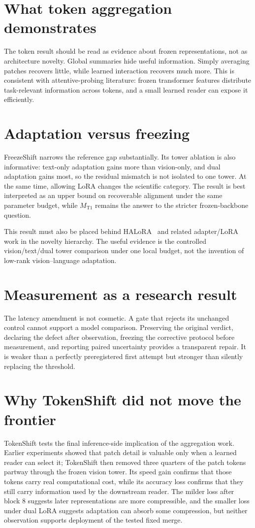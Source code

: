 \documentclass[11pt,a4paper,oneside]{report}
\newcommand{\MTone}{\ensuremath{M_{\mathrm{T1}}}}
\begin{document}
\section{What token aggregation demonstrates}
The token result should be read as evidence about frozen representations, not as architecture novelty. Global summaries hide useful information. Simply averaging patches recovers little, while learned interaction recovers much more. This is consistent with attentive-probing literature: frozen transformer features distribute task-relevant information across tokens, and a small learned reader can expose it efficiently.

\section{Adaptation versus freezing}
FreezeShift narrows the reference gap substantially. Its tower ablation is also informative: text-only adaptation gains more than vision-only, and dual adaptation gains most, so the residual mismatch is not isolated to one tower. At the same time, allowing LoRA changes the scientific category. The result is best interpreted as an upper bound on recoverable alignment under the same parameter budget, while \MTone{} remains the answer to the stricter frozen-backbone question.

This result must also be placed behind HALoRA~\cite{zhang2026halora} and related adapter/LoRA work in the novelty hierarchy. The useful evidence is the controlled vision/text/dual tower comparison under one local budget, not the invention of low-rank vision--language adaptation.

\section{Measurement as a research result}
The latency amendment is not cosmetic. A gate that rejects its unchanged control cannot support a model comparison. Preserving the original verdict, declaring the defect after observation, freezing the corrective protocol before measurement, and reporting paired uncertainty provides a transparent repair. It is weaker than a perfectly preregistered first attempt but stronger than silently replacing the threshold.

\section{Why TokenShift did not move the frontier}
TokenShift tests the final inference-side implication of the aggregation work. Earlier experiments showed that patch detail is valuable only when a learned reader can select it; TokenShift then removed three quarters of the patch tokens partway through the frozen vision tower. Its speed gain confirms that those tokens carry real computational cost, while its accuracy loss confirms that they still carry information used by the downstream reader. The milder loss after block 8 suggests later representations are more compressible, and the smaller loss under dual LoRA suggests adaptation can absorb some compression, but neither observation supports deployment of the tested fixed merge.
\end{document}
